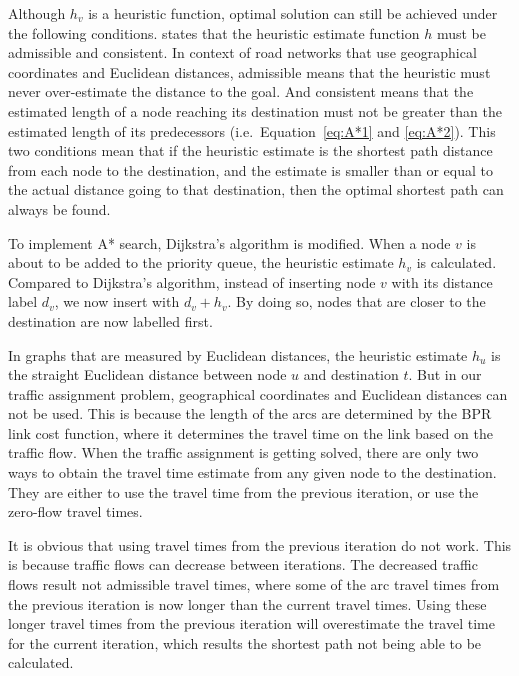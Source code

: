 Although $h_v$ is a heuristic function,
optimal solution can still be achieved under the following conditions.
\citet{Astar} states that the heuristic estimate function $h$ must be admissible and consistent.
In context of road networks that use geographical coordinates and Euclidean distances,
admissible means that the heuristic must never over-estimate the distance to the goal.
And consistent means that the estimated length of a node reaching its destination must not be greater than the estimated length of its predecessors (i.e.\ Equation~\ref{eq:A*1} and \ref{eq:A*2}).
This two conditions mean that if the heuristic estimate is the shortest path distance from each node to the destination,
and the estimate is smaller than or equal to the actual distance going to that destination,
then the optimal shortest path can always be found. 


To implement A* search,
Dijkstra's algorithm is modified.
When a node $v$ is about to be added to the priority queue,
the heuristic estimate $h_v$ is calculated.
Compared to Dijkstra's algorithm,
instead of inserting node $v$ with its distance label $d_v$,
we now insert with $d_v + h_v$.
By doing so,
nodes that are closer to the destination are now labelled first.

In graphs that are measured by Euclidean distances,
the heuristic estimate $h_u$ is the straight Euclidean distance between node $u$ and destination $t$.
But in our traffic assignment problem,
geographical coordinates and Euclidean distances can not be used.
This is because the length of the arcs are determined by the BPR link cost function,
where it determines the travel time on the link based on the traffic flow.
When the traffic assignment is getting solved,
there are only two ways to obtain the travel time estimate from any given node to the destination.
They are either to use the travel time from the previous iteration,
or use the zero-flow travel times.

It is obvious that using travel times from the previous iteration do not work.
This is because traffic flows can decrease between iterations.
The decreased traffic flows result not admissible travel times,
where some of the arc travel times from the previous iteration is now longer than the current travel times.
Using these longer travel times from the previous iteration will overestimate the travel time for the current iteration,
which results the shortest path not being able to be calculated.

